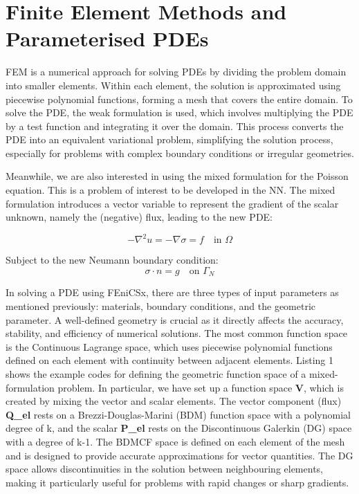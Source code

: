 \section{Finite Element Methods and Parameterised PDEs}

FEM is a numerical approach for solving PDEs by dividing the problem domain into smaller elements. Within each element, the solution is approximated using piecewise polynomial functions, forming a mesh that covers the entire domain. To solve the PDE, the weak formulation is used, which involves multiplying the PDE by a test function and integrating it over the domain. This process converts the PDE into an equivalent variational problem, simplifying the solution process, especially for problems with complex boundary conditions or irregular geometries.

Meanwhile, we are also interested in using the mixed formulation for the Poisson equation. This is a problem of interest to be developed in the NN. The mixed formulation introduces a vector variable to represent the gradient of the scalar unknown, namely the (negative) flux, leading to the new PDE:

\begin{equation*}
    -\nabla^2 u = - \nabla \sigma = f \quad \text{in }\Omega
\end{equation*}

Subject to the new Neumann boundary condition:
\begin{equation*}
    \sigma  \cdot n = g \quad \text{on }\Gamma_{N}
\end{equation*}

In solving a PDE using FEniCSx, there are three types of input parameters as mentioned previously: materials, boundary conditions, and the geometric parameter. A well-defined geometry is crucial as it directly affects the accuracy, stability, and efficiency of numerical solutions. The most common function space is the Continuous Lagrange space, which uses piecewise polynomial functions defined on each element with continuity between adjacent elements. Listing 1 shows the example codes for defining the geometric function space of a mixed-formulation problem. In particular, we have set up a function space \textbf{V}, which is created by mixing the vector and scalar elements. The vector component (flux) \textbf{Q\_el} rests on a Brezzi-Douglas-Marini (BDM) function space with a polynomial degree of k, and the scalar \textbf{P\_el} rests on the Discontinuous Galerkin (DG) space with a degree of k-1. The BDMCF space is defined on each element of the mesh and is designed to provide accurate approximations for vector quantities. The DG space allows discontinuities in the solution between neighbouring elements, making it particularly useful for problems with rapid changes or sharp gradients. 

